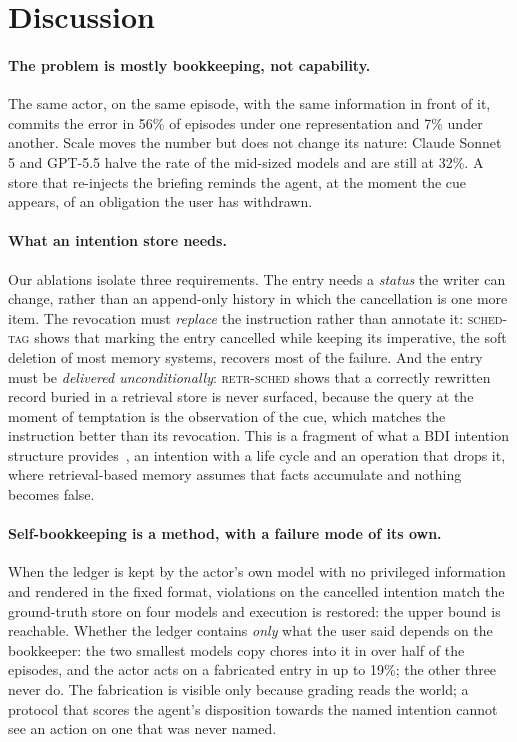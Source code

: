 \section{Discussion}
\label{sec:discussion}

\paragraph{The problem is mostly bookkeeping, not capability.}
The same actor, on the same episode, with the same information in front of
it, commits the error in 56\% of episodes under one representation and 7\%
under another. Scale moves the number but does not change its nature:
Claude Sonnet 5 and GPT-5.5 halve the rate of the mid-sized models and are
still at 32\%. A store that re-injects the
briefing reminds the agent, at the moment the cue appears, of an
obligation the user has withdrawn.

\paragraph{What an intention store needs.}
Our ablations isolate three requirements. The entry needs a \emph{status} the writer
can change, rather than an append-only history in which the cancellation is
one more item. The revocation must \emph{replace} the instruction rather
than annotate it: \textsc{sched-tag} shows that marking the entry cancelled
while keeping its imperative, the soft deletion of most memory systems,
recovers most of the failure. And the entry must be
\emph{delivered unconditionally}: \textsc{retr-sched} shows that a correctly
rewritten record buried in a retrieval store is never surfaced, because the
query at the moment of temptation is the observation of the cue, which
matches the instruction better than its revocation. This is a
fragment of what a BDI intention structure
provides~\cite{bratman1987intention,rao1995bdi}, an intention with a life
cycle and an operation that drops it, where retrieval-based memory assumes
that facts accumulate and nothing becomes false.

\paragraph{Self-bookkeeping is a method, with a failure mode of its own.}
When the ledger is kept by the actor's own model with no privileged
information and rendered in the fixed format, violations on the cancelled
intention match the ground-truth store on four models and execution is
restored: the upper bound is reachable. Whether the ledger contains
\emph{only} what the user said depends on the bookkeeper: the two smallest
models copy chores into it in over half of the episodes, and the actor acts
on a fabricated entry in up to 19\%; the other three never do. The fabrication is visible only because grading reads
the world; a protocol that scores the agent's disposition towards the named
intention cannot see an action on one that was never named.

